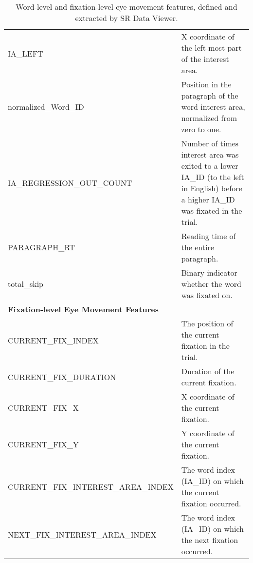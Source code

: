 \begin{table*}[ht]
{\begin{tabular}{@{}ll@{}}
IA\_LEFT                                                   & X coordinate of the left-most part of the interest area.                                                   \\
normalized\_Word\_ID                                       & Position in the paragraph of the word interest area, normalized from zero to one.                          \\
IA\_REGRESSION\_OUT\_COUNT  & Number of times interest area was exited to a lower IA\_ID (to the left in English) before a higher IA\_ID was fixated in the trial.         \\
PARAGRAPH\_RT                                              & Reading time of the entire paragraph.                                                                      \\
total\_skip                                                & Binary indicator whether the word was fixated on.                                                          \\ \midrule
\textbf{Fixation-level Eye Movement Features}              &                                                                                                            \\ \midrule
CURRENT\_FIX\_INDEX                                        & The position of the current fixation in the trial.                                                         \\
CURRENT\_FIX\_DURATION                                     & Duration of the current fixation.                                                                          \\
CURRENT\_FIX\_X                                            & X coordinate of the current fixation.                                                                      \\
CURRENT\_FIX\_Y                                            & Y coordinate of the current fixation.                                                                      \\
CURRENT\_FIX\_INTEREST\_AREA\_INDEX                        & The word index (IA\_ID) on which the current fixation occurred.                                            \\
NEXT\_FIX\_INTEREST\_AREA\_INDEX                           & The word index (IA\_ID) on which the next fixation occurred.                                               \\ \bottomrule
\end{tabular}%
}
\caption{Word-level and fixation-level eye movement features, defined and extracted by SR Data Viewer.}
\label{app:tab:combined-eye-movement-features}
\end{table*}


